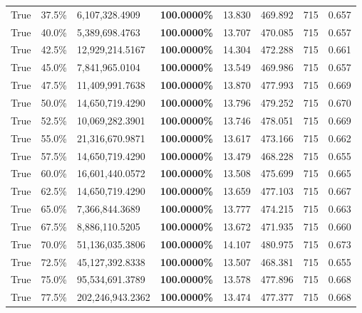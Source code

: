 \begin{table}[H]
\begin{tabular}{lllrllll}
\cline{1-8}
True & 37.5\% & 6,107,328.4909 & \bfseries \color{red} 100.0000\% & 13.830 & 469.892 & 715 & 0.657 \\
\cline{1-8}
True & 40.0\% & 5,389,698.4763 & \bfseries \color{red} 100.0000\% & 13.707 & 470.085 & 715 & 0.657 \\
\cline{1-8}
True & 42.5\% & 12,929,214.5167 & \bfseries \color{red} 100.0000\% & 14.304 & 472.288 & 715 & 0.661 \\
\cline{1-8}
True & 45.0\% & 7,841,965.0104 & \bfseries \color{red} 100.0000\% & 13.549 & 469.986 & 715 & 0.657 \\
\cline{1-8}
True & 47.5\% & 11,409,991.7638 & \bfseries \color{red} 100.0000\% & 13.870 & 477.993 & 715 & 0.669 \\
\cline{1-8}
True & 50.0\% & 14,650,719.4290 & \bfseries \color{red} 100.0000\% & 13.796 & 479.252 & 715 & 0.670 \\
\cline{1-8}
True & 52.5\% & 10,069,282.3901 & \bfseries \color{red} 100.0000\% & 13.746 & 478.051 & 715 & 0.669 \\
\cline{1-8}
True & 55.0\% & 21,316,670.9871 & \bfseries \color{red} 100.0000\% & 13.617 & 473.166 & 715 & 0.662 \\
\cline{1-8}
True & 57.5\% & 14,650,719.4290 & \bfseries \color{red} 100.0000\% & 13.479 & 468.228 & 715 & 0.655 \\
\cline{1-8}
True & 60.0\% & 16,601,440.0572 & \bfseries \color{red} 100.0000\% & 13.508 & 475.699 & 715 & 0.665 \\
\cline{1-8}
True & 62.5\% & 14,650,719.4290 & \bfseries \color{red} 100.0000\% & 13.659 & 477.103 & 715 & 0.667 \\
\cline{1-8}
True & 65.0\% & 7,366,844.3689 & \bfseries \color{red} 100.0000\% & 13.777 & 474.215 & 715 & 0.663 \\
\cline{1-8}
True & 67.5\% & 8,886,110.5205 & \bfseries \color{red} 100.0000\% & 13.672 & 471.935 & 715 & 0.660 \\
\cline{1-8}
True & 70.0\% & 51,136,035.3806 & \bfseries \color{red} 100.0000\% & 14.107 & 480.975 & 715 & 0.673 \\
\cline{1-8}
True & 72.5\% & 45,127,392.8338 & \bfseries \color{red} 100.0000\% & 13.507 & 468.381 & 715 & 0.655 \\
\cline{1-8}
True & 75.0\% & 95,534,691.3789 & \bfseries \color{red} 100.0000\% & 13.578 & 477.896 & 715 & 0.668 \\
\cline{1-8}
True & 77.5\% & 202,246,943.2362 & \bfseries \color{red} 100.0000\% & 13.474 & 477.377 & 715 & 0.668 \\

\end{tabular}
\end{table}
